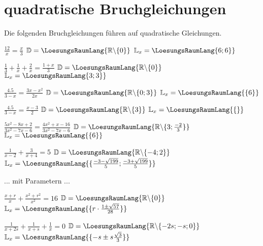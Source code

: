\platzFuerBerechnungenBisEndeSeite{}
\section{quadratische Bruchgleichungen}
Die folgenden Bruchgleichungen führen auf quadratische Gleichungen.


\begin{bbwAufgabenBlock}
\item $\frac{12}x = \frac{x}3$ \hspace{10mm}   $\mathbb{D}= \LoesungsRaumLang{\mathbb{R}\backslash\{0\}}$  $\mathbb{L}_x = \LoesungsRaumLang{\-6; 6\}}$
\item $\frac13 + \frac1x + \frac2x = \frac{1+x}3$ \hspace{10mm}   $\mathbb{D}= \LoesungsRaumLang{\mathbb{R}\backslash\{0\}}$  $\mathbb{L}_x = \LoesungsRaumLang{\-3; 3\}}$
\item $\frac{4.5}{3-x} = \frac{3x-x^2}{2x}$ \hspace{10mm}   $\mathbb{D}= \LoesungsRaumLang{\mathbb{R}\backslash\{0;3\}}$  $\mathbb{L}_x = \LoesungsRaumLang{\{6\}}$
\item $\frac{4.5}{3-x} = \frac{x-3}{2}$ \hspace{10mm}   $\mathbb{D}= \LoesungsRaumLang{\mathbb{R}\backslash\{3\}}$  $\mathbb{L}_x = \LoesungsRaumLang{\{\}}$
\item $\frac{5x^2-8x+2}{3x^2-7x-6}=\frac{4x^2+x-16}{3x^2-7x-6}$ \hspace{10mm}   $\mathbb{D}= \LoesungsRaumLang{\mathbb{R}\backslash\{3;\frac{-2}3\}}$  $\mathbb{L}_x = \LoesungsRaumLang{\{6\}}$
\item $\frac1{x-2} + \frac3{x+4} = 5$ \hspace{10mm}         $\mathbb{D}= \LoesungsRaumLang{\mathbb{R}\backslash\{-4;2\}}$          $\mathbb{L}_x = \LoesungsRaumLang{\{\frac{-3-\sqrt{199}}{5};\frac{-3+\sqrt{199}}{5} \}}$

\end{bbwAufgabenBlock}

\platzFuerBerechnungenBisEndeSeite{}



... mit Parametern ...


\begin{bbwAufgabenBlock}
\item $\frac{x+r}x + \frac{x^2+r^2}{x^2} = 16$ \hspace{10mm}         $\mathbb{D}= \LoesungsRaumLang{\mathbb{R}\backslash\{0\}}$          $\mathbb{L}_x = \LoesungsRaumLang{\{r\cdot{}\frac{1\pm\sqrt{57}}{28} \}}$
\item $\frac1{x+2s}+ \frac1{x+s} + \frac1{x}=0$ \hspace{10mm}
$\mathbb{D}= \LoesungsRaumLang{\mathbb{R}\backslash\{-2s;-s;0\}}$
$\mathbb{L}_x = \LoesungsRaumLang{\{-s\pm s\frac{\sqrt{3}}{3} \}}$

\end{bbwAufgabenBlock}

